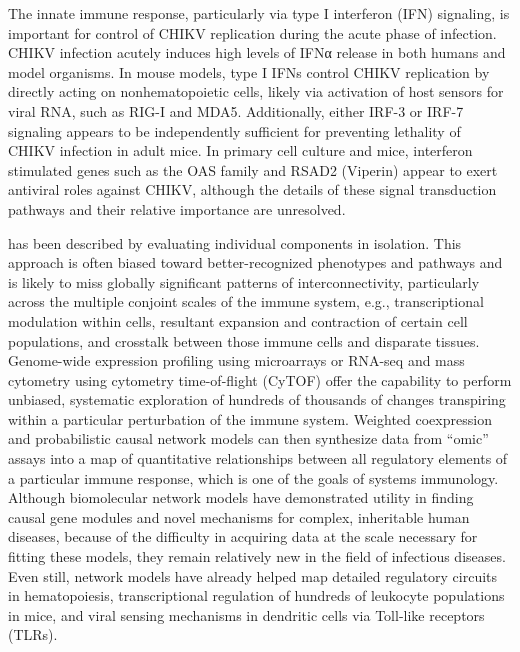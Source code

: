 The innate immune response, particularly via type I interferon (IFN) signaling, is important for control of CHIKV replication during the acute phase of infection.\autocite{Burt2017,Schilte2010} CHIKV infection acutely induces high levels of IFNα release in both humans and model organisms.\autocite{Labadie2010,Teng2015} In mouse models, type I IFNs control CHIKV replication by directly acting on nonhematopoietic cells, likely via activation of host sensors for viral RNA, such as RIG-I and MDA5.\autocite{Schilte2010} Additionally, either IRF-3 or IRF-7 signaling appears to be independently sufficient for preventing lethality of CHIKV infection in adult mice.\autocite{Schilte2012} In primary cell culture and mice, interferon stimulated genes such as the OAS family and RSAD2 (Viperin) appear to exert antiviral roles against CHIKV, although the details of these signal transduction pathways and their relative importance are unresolved.\autocite{Burt2017}

 has been described by evaluating individual components in isolation. This approach is often biased toward better-recognized phenotypes and pathways and is likely to miss globally significant patterns of interconnectivity, particularly across the multiple conjoint scales of the immune system, e.g., transcriptional modulation within cells, resultant expansion and contraction of certain cell populations, and crosstalk between those immune cells and disparate tissues. Genome-wide expression profiling using microarrays or RNA-seq and mass cytometry using cytometry time-of-flight (CyTOF) offer the capability to perform unbiased, systematic exploration of hundreds of thousands of changes transpiring within a particular perturbation of the immune system. Weighted coexpression and probabilistic causal network models can then synthesize data from “omic” assays into a map of quantitative relationships between all regulatory elements of a particular immune response, which is one of the goals of systems immunology. Although biomolecular network models have demonstrated utility in finding causal gene modules and novel mechanisms for complex, inheritable human diseases, because of the difficulty in acquiring data at the scale necessary for fitting these models, they remain relatively new in the field of infectious diseases. Even still, network models have already helped map detailed regulatory circuits in hematopoiesis, transcriptional regulation of hundreds of leukocyte populations in mice, and viral sensing mechanisms in dendritic cells via Toll-like receptors (TLRs).\autocite{Kidd2014}

